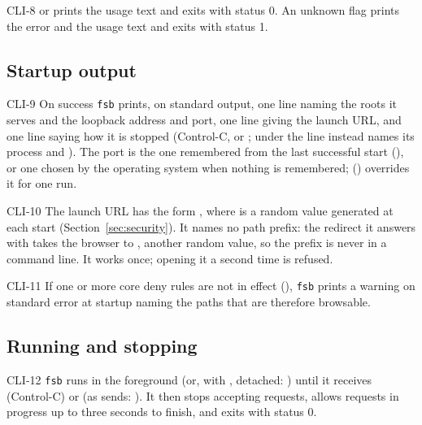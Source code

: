 \begin{req}{CLI-8}
 or  prints the usage text and exits with status 0.  An
unknown flag prints the error and the usage text and exits with status 1.
\end{req}

\subsection{Startup output}

\begin{req}{CLI-9}
On success \texttt{fsb} prints, on standard output, one line naming the roots it
serves and the loopback address and port, one line giving the launch URL, and one
line saying how it is stopped (Control-C, or ; under
 the line instead names its process and ).
The port is the one remembered from the last successful start (), or one
chosen by the operating system when nothing is remembered; 
() overrides it for one run.
\end{req}

\begin{req}{CLI-10}
The launch URL has the form , where
 is a random value generated at each start (Section~\ref{sec:security}).
It names no path prefix: the redirect it answers with takes the browser to
, another random value, so the prefix is never in a command line.
It works once; opening it a second time is refused.
\end{req}

\begin{req}{CLI-11}
If one or more core deny rules are not in effect (),
\texttt{fsb} prints a warning on standard error at startup naming the paths that are
therefore browsable.
\end{req}

\subsection{Running and stopping}

\begin{req}{CLI-12}
\texttt{fsb} runs in the foreground (or, with , detached:
) until it receives  (Control-C) or 
(as  sends: ).  It then stops accepting requests, allows requests in progress up to
three seconds to finish, and exits with status 0.
\end{req}

